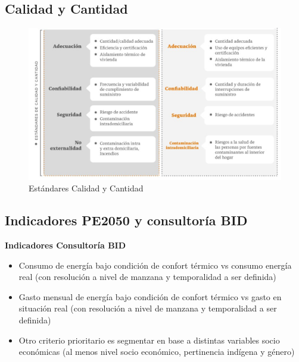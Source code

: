 \documentclass[
]{book}
\providecommand{\tightlist}{%
  \setlength{\itemsep}{0pt}\setlength{\parskip}{0pt}}
\begin{document}
\hypertarget{calidad-y-cantidad}{%
\subsection{Calidad y Cantidad}\label{calidad-y-cantidad}}

\begin{figure}

{\centering \includegraphics[width=1\linewidth]{images/calidad_cant} 

}

\caption{Estándares Calidad y Cantidad}\label{fig:unnamed-chunk-6}
\end{figure}

\hypertarget{indicadores-pe2050-y-consultoruxeda-bid}{%
\subsection{Indicadores PE2050 y consultoría BID}\label{indicadores-pe2050-y-consultoruxeda-bid}}

\textbf{Indicadores Consultoría BID}

\begin{itemize}
\tightlist
\item
  Consumo de energía bajo condición de confort térmico vs consumo energía real (con resolución a nivel de manzana y temporalidad a ser definida)
\item
  Gasto mensual de energía bajo condición de confort térmico vs gasto en situación real (con resolución a nivel de manzana y temporalidad a ser definida)
\item
  Otro criterio prioritario es segmentar en base a distintas variables socio económicas (al menos nivel socio económico, pertinencia indígena y género)
\end{itemize}
\end{document}
